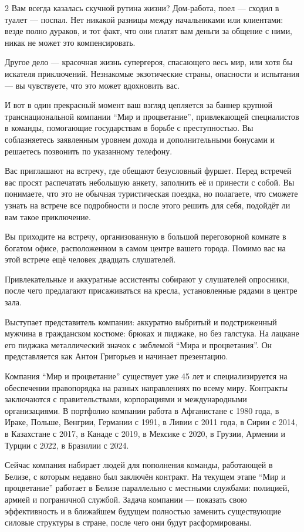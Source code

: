 \documentclass{article}
\begin{document}
\begin{multicols}{2}
Вам всегда казалась скучной рутина жизни? Дом-работа, поел --- сходил в туалет --- поспал. Нет никакой разницы между начальниками или клиентами: везде полно дураков, и тот факт, что они платят вам деньги за общение с ними, никак не может это компенсировать.

Другое дело --- красочная жизнь супергероя, спасающего весь мир, или хотя бы искателя приключений. Незнакомые экзотические страны, опасности и испытания --- вы чувствуете, что это может вдохновить вас.

И вот в один прекрасный момент ваш взгляд цепляется за баннер крупной транснациональной компании ``Мир и процветание'', привлекающей специалистов в команды, помогающие государствам в борьбе с преступностью. Вы соблазняетесь заявленным уровнем дохода и дополнительными бонусами и решаетесь позвонить по указанному телефону.

Вас приглашают на встречу, где обещают безусловный фуршет. Перед встречей вас просят распечатать небольшую анкету, заполнить её и принести с собой. Вы понимаете, что это не обычная туристическая поездка, но полагаете, что сможете узнать на встрече все подробности и после этого решить для себя, подойдёт ли вам такое приключение.

Вы приходите на встречу, организованную в большой переговорной комнате в богатом офисе, расположенном в самом центре вашего города. Помимо вас на этой встрече ещё человек двадцать слушателей.

Привлекательные и аккуратные ассистенты собирают у слушателей опросники, после чего предлагают присаживаться на кресла, установленные рядами в центре зала.

Выступает представитель компании: аккуратно выбритый и подстриженный мужчина в гражданском костюме: брюках и пиджаке, но без галстука. На лацкане его пиджака металлический значок с эмблемой ``Мира и процветания''. Он представляется как Антон Григорьев и начинает презентацию.

Компания ``Мир и процветание'' существует уже 45 лет и специализируется на обеспечении правопорядка на разных направлениях по всему миру. Контракты заключаются с правительствами, корпорациями и международными организациями. В портфолио компании работа в Афганистане с 1980 года, в Ираке, Польше, Венгрии, Германии с 1991, в Ливии с 2011 года, в Сирии с 2014, в Казахстане с 2017, в Канаде с 2019, в Мексике с 2020, в Грузии, Армении и Турции с 2022, в Бразилии с 2024.

Сейчас компания набирает людей для пополнения команды, работающей в Белизе, с которым недавно был заключён контракт. На текущем этапе ``Мир и процветание'' работает в Белизе параллельно с местными службами: полицией, армией и пограничной службой. Задача компании --- показать свою эффективность и в ближайшем будущем полностью заменить существующие силовые структуры в стране, после чего они будут расформированы.


\end{multicols}
\end{document}
